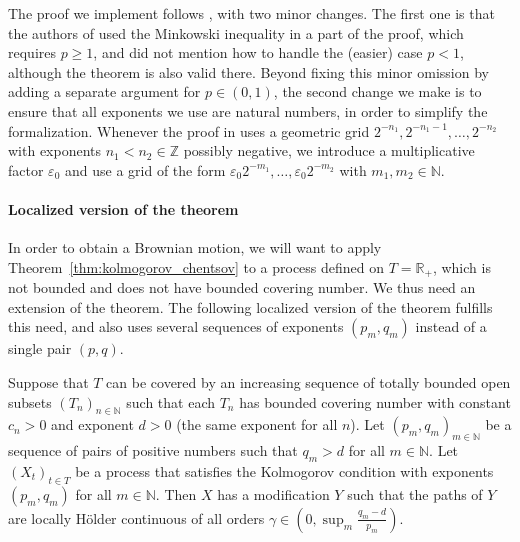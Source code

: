 \documentclass[lean]{Draft}
\begin{document}

The proof we implement follows \cite{kratschmer2023kolmogorov}, with two minor changes.
The first one is that the authors of \cite{kratschmer2023kolmogorov} used the Minkowski inequality in a part of the proof, which requires $p \ge 1$, and did not mention how to handle the (easier) case $p < 1$, although the theorem is also valid there.
Beyond fixing this minor omission by adding a separate argument for $p \in (0,1)$, the second change we make is to ensure that all exponents we use are natural numbers, in order to simplify the formalization.
Whenever the proof in \cite{kratschmer2023kolmogorov} uses a geometric grid $2^{-n_1}, 2^{-n_1-1},\ldots, 2^{-n_2}$ with exponents $n_1 < n_2 \in \mathbb{Z}$ possibly negative, we introduce a multiplicative factor $\varepsilon_0$ and use a grid of the form $\varepsilon_0 2^{-m_1}, \ldots, \varepsilon_0 2^{-m_2}$ with $m_1, m_2 \in \mathbb{N}$.


\paragraph{Localized version of the theorem}

In order to obtain a Brownian motion, we will want to apply Theorem~\ref{thm:kolmogorov_chentsov} to a process defined on $T = \mathbb{R}_+$, which is not bounded and does not have bounded covering number.
We thus need an extension of the theorem.
The following localized version of the theorem fulfills this need, and also uses several sequences of exponents $(p_m, q_m)$ instead of a single pair $(p, q)$.


\begin{theorem}\label{thm:localized_holder_modification_sup}
Suppose that $T$ can be covered by an increasing sequence of totally bounded open subsets $(T_n)_{n \in \mathbb{N}}$ such that each $T_n$ has bounded covering number with constant $c_n > 0$ and exponent $d > 0$ (the same exponent for all $n$).
Let $(p_m, q_m)_{m \in \mathbb{N}}$ be a sequence of pairs of positive numbers such that $q_m > d$ for all $m \in \mathbb{N}$.
Let $(X_t)_{t \in T}$ be a process that satisfies the Kolmogorov condition with exponents $(p_m, q_m)$ for all $m \in \mathbb{N}$.
Then $X$ has a modification $Y$ such that the paths of $Y$ are locally Hölder continuous of all orders $\gamma \in \left(0, \sup_m \frac{q_m - d}{p_m}\right)$.
\end{theorem}
\end{document}
